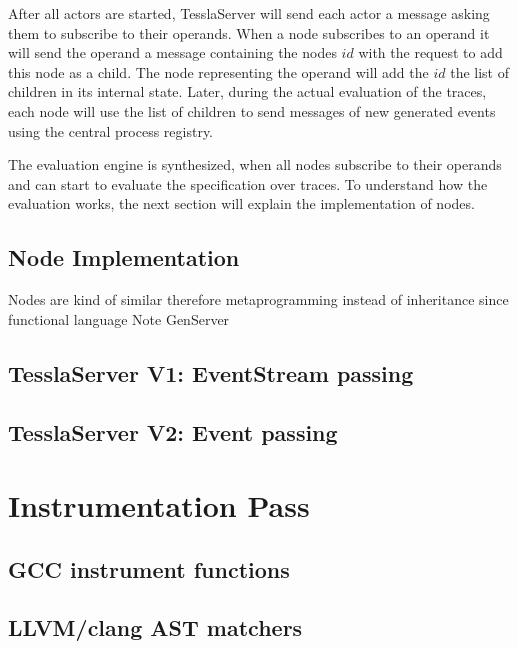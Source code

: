After all actors are started, TesslaServer will send each actor a message asking them to subscribe to their operands.
When a node subscribes to an operand it will send the operand a message containing the nodes \(\mathit{id}\) with the request to add this node as a child.
The node representing the operand will add the \(\mathit{id}\) the list of children in its internal state.
Later, during the actual evaluation of the traces, each node will use the list of children to send messages of new generated events using the central process registry.

The evaluation engine is synthesized, when all nodes subscribe to their operands and can start to evaluate the specification over traces.
To understand how the evaluation works, the next section will explain the implementation of nodes.

\subsection{Node Implementation}
Nodes are kind of similar therefore metaprogramming instead of inheritance since functional language
Note GenServer

\subsection{TesslaServer V1: EventStream passing}
\subsection{TesslaServer V2: Event passing}

\section{Instrumentation Pass}
\label{sec:implementation:instrumentation}


\subsection{GCC instrument functions}
\subsection{LLVM/clang AST matchers}
